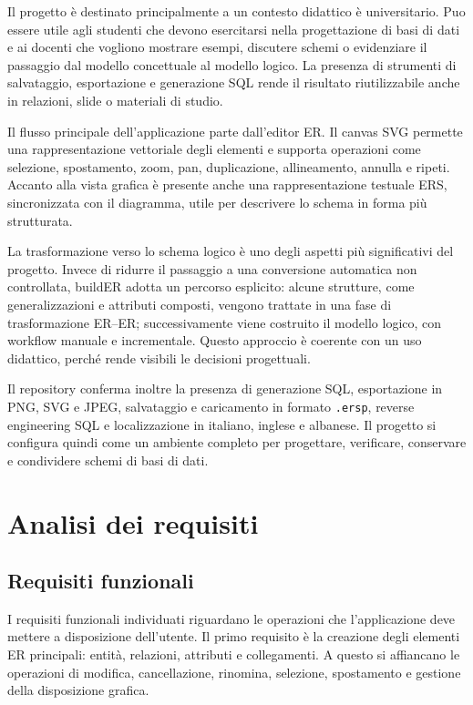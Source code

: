 \documentclass{unipd-thesis-modern}
\newcommand{\builder}{buildER}
\begin{document}
Il progetto è destinato principalmente a un contesto didattico è universitario. Puo essere utile agli studenti che devono esercitarsi nella progettazione di basi di dati e ai docenti che vogliono mostrare esempi, discutere schemi o evidenziare il passaggio dal modello concettuale al modello logico. La presenza di strumenti di salvataggio, esportazione e generazione SQL rende il risultato riutilizzabile anche in relazioni, slide o materiali di studio.

Il flusso principale dell'applicazione parte dall'editor ER. Il canvas SVG permette una rappresentazione vettoriale degli elementi e supporta operazioni come selezione, spostamento, zoom, pan, duplicazione, allineamento, annulla e ripeti. Accanto alla vista grafica è presente anche una rappresentazione testuale ERS, sincronizzata con il diagramma, utile per descrivere lo schema in forma più strutturata.

La trasformazione verso lo schema logico è uno degli aspetti più significativi del progetto. Invece di ridurre il passaggio a una conversione automatica non controllata, \builder{} adotta un percorso esplicito: alcune strutture, come generalizzazioni e attributi composti, vengono trattate in una fase di trasformazione ER--ER; successivamente viene costruito il modello logico, con workflow manuale e incrementale. Questo approccio è coerente con un uso didattico, perché rende visibili le decisioni progettuali.

Il repository conferma inoltre la presenza di generazione SQL, esportazione in PNG, SVG e JPEG, salvataggio e caricamento in formato \texttt{.ersp}, reverse engineering SQL e localizzazione in italiano, inglese e albanese. Il progetto si configura quindi come un ambiente completo per progettare, verificare, conservare e condividere schemi di basi di dati.


\chapter{Analisi dei requisiti}

\section{Requisiti funzionali}

I requisiti funzionali individuati riguardano le operazioni che l'applicazione deve mettere a disposizione dell'utente. Il primo requisito è la creazione degli elementi ER principali: entità, relazioni, attributi e collegamenti. A questo si affiancano le operazioni di modifica, cancellazione, rinomina, selezione, spostamento e gestione della disposizione grafica.
\end{document}
